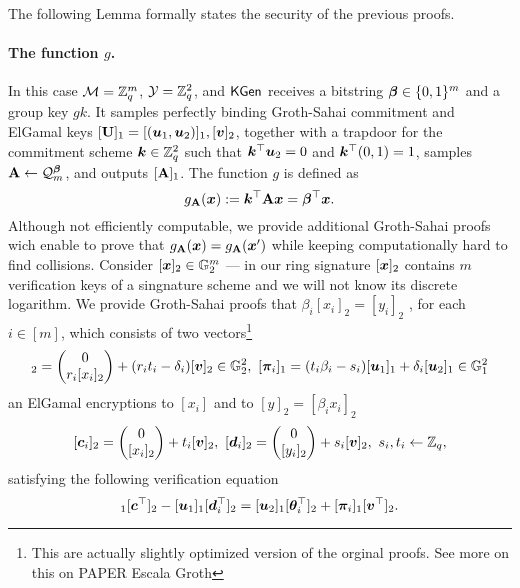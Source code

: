  The following Lemma formally states the security of the previous proofs.
\begin{lemma}
\end{lemma}

\paragraph{The function $g$.} In this case $\mathcal{M}=\mathbb{Z}_q^m$, $\mathcal{Y}=\mathbb{Z}_q^2$, and $\mathsf{KGen}$ receives a bitstring ${\boldsymbol{\beta}}\in\{0,1\}^m$ and a group key $gk$. It samples perfectly binding Groth-Sahai commitment and ElGamal keys $[\mathbf{{U}}]_1=[({\boldsymbol{u}}_1,{\boldsymbol{u}}_2)]_1,[{\boldsymbol{v}}]_2$, together with a trapdoor for the commitment scheme ${\boldsymbol{k}}\in\mathbb{Z}_q^2$ such that ${\boldsymbol{k}}^\top{\boldsymbol{u}}_2=0$ and ${\boldsymbol{k}}^\top(0,1)=1$, samples $\mathbf{{A}}\gets\mathcal{Q}_m^{\boldsymbol{\beta}}$, and outputs $[\mathbf{{A}}]_1$. The function $g$ is defined as
$$
g_{\mathbf{{A}}}({\boldsymbol{x}}):= {\boldsymbol{k}}^\top\mathbf{{A}}{\boldsymbol{x}}={\boldsymbol{\beta}}^\top{\boldsymbol{x}}.
$$
Although not efficiently computable, we provide additional Groth-Sahai proofs wich enable to prove that 
 $g_{\mathbf{{A}}}({\boldsymbol{x}}) = g_{\mathbf{{A}}}({\boldsymbol{x}}')$ while keeping computationally hard to find collisions. Consider $[{\boldsymbol{x}}]_2\in\mathbb{G}_2^m$ --- in our ring signature $[{\boldsymbol{x}}]_2$ contains $m$ verification keys of a singnature scheme and we will not know its discrete logarithm.
We provide Groth-Sahai proofs that $\beta_i[x_i]_2=[y_i]_2$ , for each $i\in[m]$, which consists of two vectors\footnote{This are actually slightly optimized version of the orginal proofs. See more on this on PAPER Escala Groth}
\begin{equation}
[\vecb{\theta}_i]_2=\pmatri{0\\{r_i[x_i]_2}}+(r_it_i-\delta_i)[\vecb{v}]_2\in\GG_2^2,\ [\vecb{\pi}_i]_1 =(t_i\beta_i-s_i)[\vecb{u}_1]_1+\delta_i[\vecb{u}_2]_1\in\GG_1^2
\label{eq:wi-proofs}
\end{equation}
an ElGamal encryptions to $[x_i]$ and to $[y]_2=[\beta_ix_i]_2$
$$
[{\boldsymbol{c}}_i]_2= \left(\begin{matrix}0\\{[x_i]_2}\end{matrix}\right)+t_i[{\boldsymbol{v}}]_2,\ [{\boldsymbol{d}}_i]_2 = \left(\begin{matrix}0\\ [y_i]_2\end{matrix}\right) + s_i[{\boldsymbol{v}}]_2,\ s_i,t_i\gets\mathbb{Z}_q,
$$
satisfying the following verification equation
\begin{equation}
[\vecb{a}_i]_1[\vecb{c}^\top]_2-[\vecb{u}_1]_1[\vecb{d}^\top_i]_2 =[\vecb{u}_2]_1[\vecb{\theta}^\top_i]_2+[\vecb{\pi}_i]_1[\vecb{v}^\top]_2.
\label{eq:wi-verif}
\end{equation}


